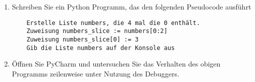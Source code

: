 \begin{enumerate}
	\item Schreiben Sie ein Python Programm, das den folgenden Pseudocode ausführt
	\begin{lstlisting}
	Erstelle Liste numbers, die 4 mal die 0 enthält.
	Zuweisung numbers_slice := numbers[0:2]
	Zuweisung numbers_slice[0] := 3
	Gib die Liste numbers auf der Konsole aus
	\end{lstlisting}
	\item Öffnen Sie PyCharm und untersuchen Sie das Verhalten des obigen Programms zeilenweise unter Nutzung des Debuggers.
\end{enumerate}